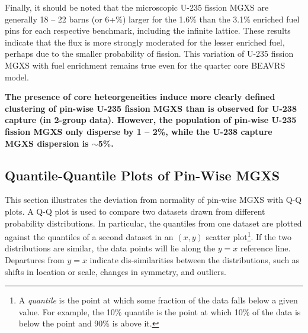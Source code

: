 Finally, it should be noted that the microscopic U-235 fission \ac{MGXS} are generally 18 -- 22 barns (or 6+\%) larger for the 1.6\% than the 3.1\% enriched fuel pins for each respective benchmark, including the infinite lattice. These results indicate that the flux is more strongly moderated for the lesser enriched fuel, perhaps due to the smaller probability of fission. This variation of U-235 fission \ac{MGXS} with fuel enrichment remains true even for the quarter core \ac{BEAVRS} model. 

\begin{emphbox}
\textbf{The presence of core heteorgeneities induce more clearly defined clustering of pin-wise U-235 fission \ac{MGXS} than is observed for U-238 capture (in 2-group data). However, the population of pin-wise U-235 fission \ac{MGXS} only disperse by 1 -- 2\%, while the U-238 capture \ac{MGXS} dispersion is $\sim$5\%.}
\end{emphbox}

\subsection{Quantile-Quantile Plots of Pin-Wise MGXS}
\label{subsec:chap9-qq-plots}

This section illustrates the deviation from normality of pin-wise \ac{MGXS} with \ac{Q-Q} plots. A \ac{Q-Q} plot is used to compare two datasets drawn from different probability distributions. In particular, the quantiles from one dataset are plotted against the quantiles of a second dataset in an $(x,y)$ scatter plot\footnote{A \textit{quantile} is the point at which some fraction of the data falls below a given value. For example, the 10\% quantile is the point at which 10\% of the data is below the point and 90\% is above it.}. If the two distributions are similar, the data points will lie along the $y = x$ reference line. Departures from $y = x$ indicate dis-similarities between the distributions, such as shifts in location or scale, changes in symmetry, and outliers. 


